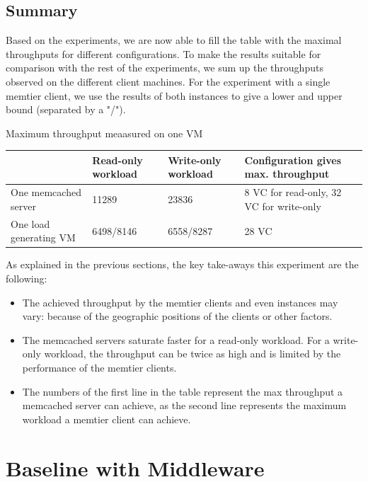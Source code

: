 \documentclass[11pt,a4paper]{article}
\begin{document}
\subsection{Summary}


Based on the experiments, we are now able to fill the table with the maximal throughputs for different configurations. To make the results suitable for comparison with the rest of the experiments, we sum up the throughputs observed on the different client machines. For the experiment with a single memtier client, we use the results of both instances to give a lower and upper bound (separated by a "/"). 

\begin{center}
	{Maximum throughput meaasured on one VM}
	\begin{tabular}{|l|p{2cm}|p{2cm}|p{4cm}|}
		\hline                        & Read-only workload & Write-only workload & Configuration gives max. throughput \\ 
		\hline One memcached server   &11289                    &23836                     &8 VC for read-only, 32  VC for write-only                                     \\ 
		\hline One load generating VM &6498/8146                    &6558/8287                     &28 VC                                     \\ 
		\hline 
	\end{tabular}
\end{center}
As explained in the previous sections, the key take-aways this experiment are the following:

\begin{itemize}
\item The achieved throughput by the memtier clients and even instances may vary: because of the geographic positions of the clients or other factors. 
\item The memcached servers saturate faster for a read-only workload. For a write-only workload, the throughput can be twice as high and is limited by the performance of the memtier clients. 
\item The numbers of the first line in the table represent the max throughput a memcached server can achieve, as the second line represents the maximum workload a memtier client can achieve. 
\end{itemize}
\newpage

\section{Baseline with Middleware}
\end{document}
